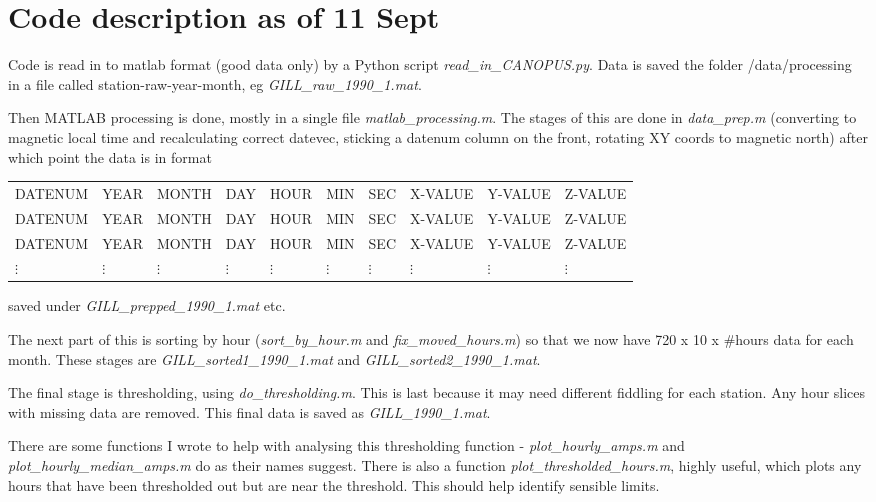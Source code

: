 \documentclass[11pt]{article}
\begin{document}
\section{Code description as of 11 Sept}
Code is read in to matlab format (good data only) by a Python script
\emph{read\_in\_CANOPUS.py}. Data
is saved the folder /data/processing  in a file called station-raw-year-month, eg
\emph{GILL\_raw\_1990\_1.mat}.

Then MATLAB processing is done, mostly in a single file \emph{matlab\_processing.m}. The
stages of this are done in \emph{data\_prep.m} (converting to magnetic local time and
recalculating correct datevec, sticking a datenum column on the front, rotating XY coords to
magnetic north) after which point the data is in format

        \begin{table}[h]
            \begin{tabular}{llllllllll}
            DATENUM &YEAR &MONTH &DAY &HOUR &MIN &SEC &X-VALUE &Y-VALUE &Z-VALUE \\
            DATENUM &YEAR &MONTH &DAY &HOUR &MIN &SEC &X-VALUE &Y-VALUE &Z-VALUE \\
            DATENUM &YEAR &MONTH &DAY &HOUR &MIN &SEC &X-VALUE &Y-VALUE &Z-VALUE \\ 
        $\vdots$ &$\vdots$  &$\vdots$ &$\vdots$ &$\vdots$  &$\vdots$ &$\vdots$  &$\vdots$  &$\vdots$  &$\vdots$



        \end{tabular}
    \end{table}

saved under \emph{GILL\_prepped\_1990\_1.mat} etc.

The next part of this is sorting by hour (\emph{sort\_by\_hour.m} and
\emph{fix\_moved\_hours.m}) so that we now have 720 x 10 x \#hours data for each month. These
stages are \emph{GILL\_sorted1\_1990\_1.mat} and \emph{GILL\_sorted2\_1990\_1.mat}.

The final stage is thresholding, using \emph{do\_thresholding.m}. This is last because it may need different fiddling for each
station. Any hour slices with missing data are removed. This final data is saved as
\emph{GILL\_1990\_1.mat}.

There are some functions I wrote to help with analysing this thresholding function -
\emph{plot\_hourly\_amps.m} and \emph{plot\_hourly\_median\_amps.m} do as their names suggest.
There is also a function \emph{plot\_thresholded\_hours.m}, highly useful, which plots any hours
that have been thresholded out but are near the threshold. This should help identify sensible
limits.
\end{document}
